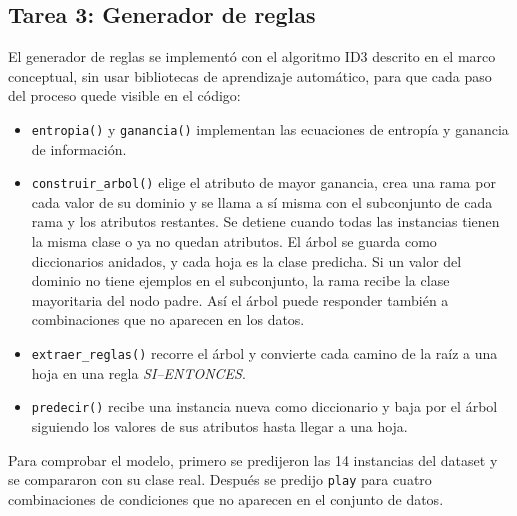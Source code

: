 \documentclass[11pt,letterpaper]{article}
\begin{document}
\subsection{Tarea 3: Generador de reglas}

El generador de reglas se implementó con el algoritmo ID3 descrito en el marco conceptual, sin usar bibliotecas de aprendizaje automático, para que cada paso del proceso quede visible en el código:

\begin{itemize}
    \item \texttt{entropia()} y \texttt{ganancia()} implementan las ecuaciones de entropía y ganancia de información.
    \item \texttt{construir\_arbol()} elige el atributo de mayor ganancia, crea una rama por cada valor de su dominio y se llama a sí misma con el subconjunto de cada rama y los atributos restantes. Se detiene cuando todas las instancias tienen la misma clase o ya no quedan atributos. El árbol se guarda como diccionarios anidados, y cada hoja es la clase predicha. Si un valor del dominio no tiene ejemplos en el subconjunto, la rama recibe la clase mayoritaria del nodo padre. Así el árbol puede responder también a combinaciones que no aparecen en los datos.
    \item \texttt{extraer\_reglas()} recorre el árbol y convierte cada camino de la raíz a una hoja en una regla \textit{SI--ENTONCES}.
    \item \texttt{predecir()} recibe una instancia nueva como diccionario y baja por el árbol siguiendo los valores de sus atributos hasta llegar a una hoja.
\end{itemize}

Para comprobar el modelo, primero se predijeron las 14 instancias del dataset y se compararon con su clase real. Después se predijo \texttt{play} para cuatro combinaciones de condiciones que no aparecen en el conjunto de datos.
\end{document}
